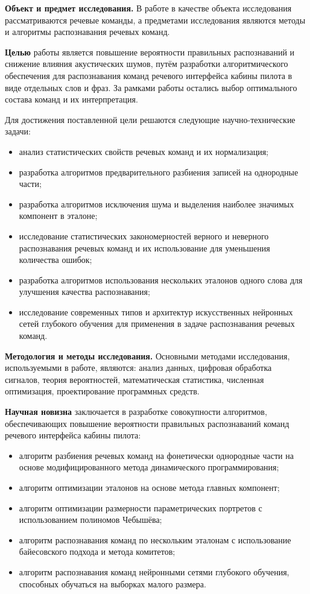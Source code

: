 \textbf{Объект и предмет исследования.}
В работе в качестве объекта исследования рассматриваются речевые команды, а предметами исследования являются методы и алгоритмы распознавания речевых команд.

\textbf{Целью} работы является повышение вероятности правильных распознаваний и снижение влияния акустических шумов, путём разработки алгоритмического обеспечения для распознавания команд речевого интерфейса кабины пилота в виде отдельных слов и фраз.
За рамками работы остались выбор оптимального состава команд и их интерпретация.

Для достижения поставленной цели решаются следующие научно-технические задачи:
\begin{itemize}
	\item анализ статистических свойств речевых команд и их нормализация;
	\item разработка алгоритмов предварительного разбиения записей на однородные части;
	\item разработка алгоритмов исключения шума и выделения наиболее значимых компонент в эталоне;
	\item исследование статистических закономерностей верного и неверного распознавания речевых команд и их использование для уменьшения количества ошибок;
	\item разработка алгоритмов использования нескольких эталонов одного слова для улучшения качества распознавания;
	\item исследование современных типов и архитектур искусственных нейронных сетей глубокого обучения для применения в задаче распознавания речевых команд.
\end{itemize}

\textbf{Методология и методы исследования.}
Основными методами исследования, используемыми в работе, являются: анализ данных, цифровая обработка сигналов, теория вероятностей, математическая статистика, численная оптимизация, проектирование программных средств.

\textbf{Научная новизна} заключается в разработке совокупности алгоритмов, обеспечивающих повышение вероятности правильных распознаваний команд речевого интерфейса кабины пилота:
\begin{itemize}
	\item алгоритм разбиения речевых команд на фонетически однородные части на основе модифицированного метода динамического программирования;
	\item алгоритм оптимизации эталонов на основе метода главных компонент;
	\item алгоритм оптимизации размерности параметрических портретов с использованием полиномов Чебышёва;
	\item алгоритм распознавания команд по нескольким эталонам с использование байесовского подхода и метода комитетов;
	\item алгоритм распознавания команд нейронными сетями глубокого обучения, способных обучаться на выборках малого размера.
\end{itemize}

